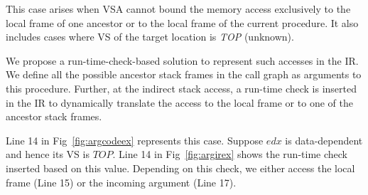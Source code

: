 {{{{{This case arises when VSA cannot bound the memory access exclusively to the local frame of one ancestor or to the local frame of the current procedure. It also includes cases where VS of the target location is \emph{TOP} (\ie unknown).

We propose a run-time-check-based solution to represent such accesses in the IR. We define all the possible ancestor stack frames in the call graph as arguments to this procedure. Further, at the indirect stack access, a run-time check is inserted in the IR to dynamically translate the access to the local frame or to one of the ancestor stack frames.

Line 14 in Fig~\ref{fig:argcodeex} represents this case. Suppose $edx$ is data-dependent and hence its VS is $TOP$. Line 14 in Fig~\ref{fig:argirex} shows the run-time check inserted based on this value. Depending on this check, we either access the local frame (Line 15) or the incoming argument (Line 17). 


}}}}}
